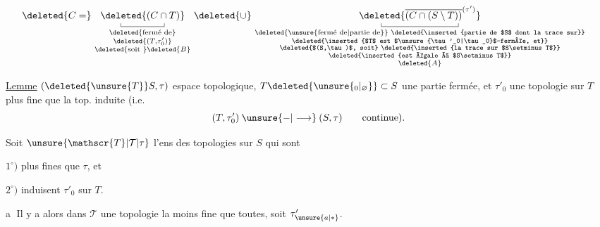 \[
\begin{aligned}
 &\deleted{C=}\ \underset{\substack{\text{\deleted{fermé de}}\\\deleted{(T,\tau'_0)}\\\text{\deleted{soit }}\deleted{B}}}{\underset{\rule{.35pt}{.35em}\rule{4.4em}{.35pt}\rule{.35pt}{.35em}}{\deleted{(C\cap T)}}}
 \ \deleted{\cup}\ 
 \underset{\substack{\text{\deleted{\unsure{fermé de|partie de}} \deleted{\inserted{partie de $S$ dont la trace sur}}}\\
 \text{\deleted{\inserted{$T$ est $\unsure{\tau'_0|\tau_0}$-fermée, et}}}\\
 \text{\deleted{$(S,\tau)$, soit} \deleted{\inserted{la trace sur $S\setminus T$}}}\\
 \text{\deleted{\inserted{est égale à $S\setminus T$}}}\\\deleted{A}}}{\underset{\rule{.35pt}{.35em}\rule{7.8em}{.35pt}\rule{.35pt}{.35em}}{\deleted{\overline{(C\cap(S\setminus T))}^{(\tau')}}}}
\end{aligned}
\]

\uline{Lemme}\quad {} $(\deleted{\unsure{T}}S,\tau)$ espace topologique, $T\deleted{\unsure{_0|_{\varnothing}}}\subset S$ une partie fermée, et $\tau'_0$ une topologie  sur $T$ plus fine que la top. induite (i.e.
\[
 (T,\tau'_0)\mathbin{\unsure{-|\longrightarrow}}(S,\tau)\qquad\text{continue).}
\]


 Soit \uline{$\unsure{\mathscr{T}|\mathcal T|\tau}$} l'ens des topologies sur $S$ qui sont

$1^\circ)$ plus fines que $\tau$, et

$2^\circ)$ induisent $\tau'_0$ sur $T$.

\textcircled{a} Il y a alors dans \uline{$\mathscr T$} une topologie la moins fine que toutes, soit $\tau'_{\unsure{a|\ast}}$.

